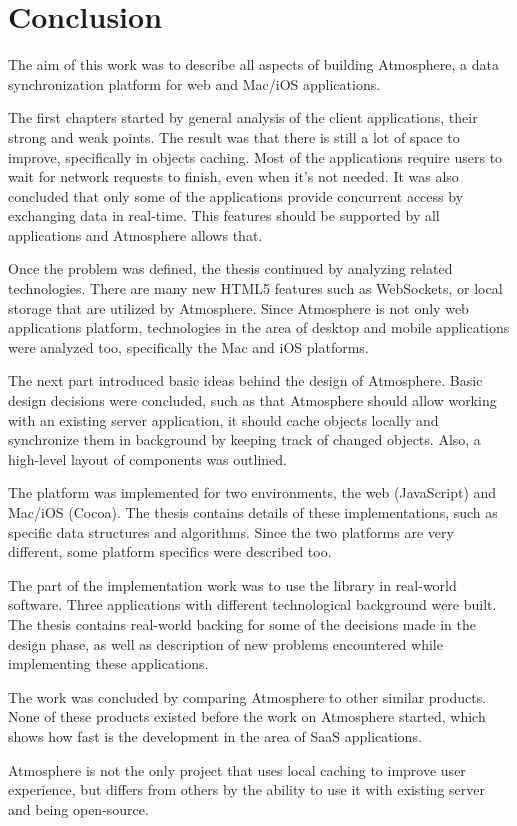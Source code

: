 \section{Conclusion}

The aim of this work was to describe all aspects of building Atmosphere, a data synchronization platform for web and Mac/iOS applications.

The first chapters started by general analysis of the client applications, their strong and weak points. The result was that there is still a lot of space to improve, specifically in objects caching. Most of the applications require users to wait for network requests to finish, even when it's not needed. It was also concluded that only some of the applications provide concurrent access by exchanging data in real-time. This features should be supported by all applications and Atmosphere allows that.

Once the problem was defined, the thesis continued by analyzing related technologies. There are many new HTML5 features such as WebSockets, or local storage that are utilized by Atmosphere. Since Atmosphere is not only web applications platform, technologies in the area of desktop and mobile applications were analyzed too, specifically the Mac and iOS platforms.

The next part introduced basic ideas behind the design of Atmosphere. Basic design decisions were concluded, such as that Atmosphere should allow working with an existing server application, it should cache objects locally and synchronize them in background by keeping track of changed objects. Also, a high-level layout of components was outlined.

The platform was implemented for two environments, the web (JavaScript) and Mac/iOS (Cocoa). The thesis contains details of these implementations, such as specific data structures and algorithms. Since the two platforms are very different, some platform specifics were described too.

The part of the implementation work was to use the library in real-world software. Three applications with different technological background were built. The thesis contains real-world backing for some of the decisions made in the design phase, as well as description of new problems encountered while implementing these applications.

The work was concluded by comparing Atmosphere to other similar products. None of these products existed before the work on Atmosphere started, which shows how fast is the development in the area of SaaS applications.

Atmosphere is not the only project that uses local caching to improve user experience, but differs from others by the ability to use it with existing server and being open-source.